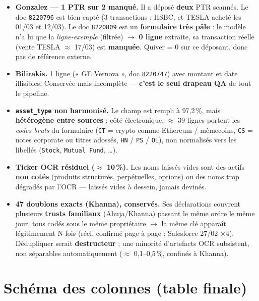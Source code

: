 \documentclass[11pt,a4paper]{article}
\begin{document}
\begin{itemize}
  \item \textbf{Gonzalez --- 1 PTR sur 2 manqué.} Il a déposé \textbf{deux} PTR scannés. Le doc
        \texttt{8220796} est bien capté (3 transactions : HSBC, et TESLA acheté les 01/03 et 12/03).
        Le doc \texttt{8220809} est un \textbf{formulaire très pâle} : le modèle n'a lu que la
        \emph{ligne-exemple} (filtrée) $\to$ \textbf{0 ligne} extraite, sa transaction réelle (vente
        TESLA $\approx$ 17/03) est \textbf{manquée}. Quiver = 0 sur ce déposant, donc pas de référence externe.
  \item \textbf{Bilirakis.} 1 ligne (« GE Vernova », doc \texttt{8220747}) avec montant et date
        illisibles. Conservée mais incomplète --- \textbf{c'est le seul drapeau QA} de tout le pipeline.
  \item \textbf{\texttt{asset\_type} non harmonisé.} Le champ est rempli à 97,2\,\%, mais
        \textbf{hétérogène entre sources} : côté électronique, $\approx$ 39 lignes portent les
        \emph{codes bruts} du formulaire (\texttt{CT} = crypto comme Ethereum / mèmecoins,
        \texttt{CS} = notes corporate ou titres adossés, \texttt{HN} / \texttt{PS} / \texttt{OL}),
        non normalisés vers les libellés (\texttt{Stock}, \texttt{Mutual Fund}, \dots).
  \item \textbf{Ticker OCR résiduel ($\approx$ 10\,\%).} Les noms laissés vides sont des actifs
        \textbf{non cotés} (produits structurés, perpétuelles, options) ou des noms trop dégradés par
        l'OCR --- laissés vides à dessein, jamais devinés.
  \item \textbf{47 doublons exacts (Khanna), conservés.} Ses déclarations couvrent plusieurs
        \textbf{trusts familiaux} (Ahuja/Khanna) passant le même ordre le même jour, tous codés sous le
        même propriétaire $\to$ la même clé apparaît légitimement N fois (réel, confirmé page à page :
        Salesforce 27/02 ×4). Dédupliquer serait \textbf{destructeur} ; une minorité d'artefacts OCR
        subsistent, non séparables automatiquement ($\approx$ 0,1--0,5\,\%, confinés à Khanna).
\end{itemize}

\section{Schéma des colonnes (table finale)}
\end{document}
